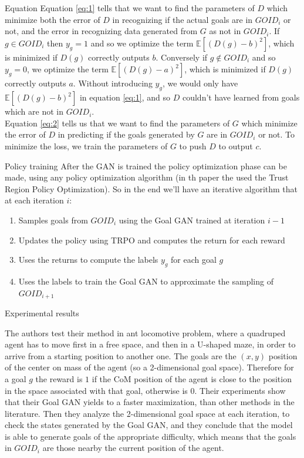 \documentclass{beamer}
\begin{document}
	\begin{frame}{Equation}
		Equation \ref{eq:1} tells that we want to find the parameters of $D$ which minimize both the error of $D$ in recognizing if the actual goals are in $GOID_i$ or not, and the error in recognizing data generated from $G$ as not in $GOID_i$. If $g \in GOID_i$ then $y_g = 1$ and so we optimize the term $\mathbb{E}[(D(g)-b)^2]$, which is minimized if $D(g)$ correctly outputs $b$. Conversely if $g \not \in GOID_i$ and so $y_g = 0$, we optimize the term $\mathbb{E}[(D(g)-a)^2]$, which is minimized if $D(g)$ correctly outputs $a$. Without introducing $y_g$, we would only have $\mathbb{E}[(D(g)-b)^2]$ in equation \ref{eq:1}, and so $D$ couldn't have learned from goals which are not in $GOID_i$.\\
		Equation \ref{eq:2} tells us that we want to find the parameters of $G$ which minimize the error of $D$ in predicting if the goals generated by $G$ are in $GOID_i$ or not. To minimize the loss, we train the parameters of $G$ to push $D$ to output $c$.
	\end{frame}

	\begin{frame}{Policy training}
		After the GAN is trained the policy optimization phase can be made, using any policy optimization algorithm (in th paper the used the Trust Region Policy Optimization). So in the end we'll have an iterative algorithm that at each iteration $i$:
		\begin{enumerate}
			\item Samples goals from $GOID_i$ using the Goal GAN trained at iteration $i-1$
			\item Updates the policy using TRPO and computes the return for each reward
			\item Uses the returns to compute the labels $y_g$ for each goal $g$
			\item Uses the labels to train the Goal GAN to approximate the sampling of $GOID_{i+1}$
		\end{enumerate}
	\end{frame}

	\begin{frame}{Experimental results}
		
		The authors test their method in ant locomotive problem, where a quadruped agent has to move first in a free space, and then in a U-shaped maze, in order to arrive from a starting position to another one. The goals are the $(x,y)$ position of the center on mass of the agent (so a 2-dimensional goal space). Therefore for a goal $g$ the reward is $1$ if the CoM position of the agent is close to the position in the space associated with that goal, otherwise is 0. Their experiments show that their Goal GAN yields to a faster maximization, than other methods in the literature. Then they analyze the 2-dimensional goal space at each iteration, to check the states generated by the Goal GAN, and they conclude that the model is able to generate goals of the appropriate difficulty, which means that the goals in $GOID_i$ are those nearby the current position of the agent. 
	\end{frame}
\end{document}
